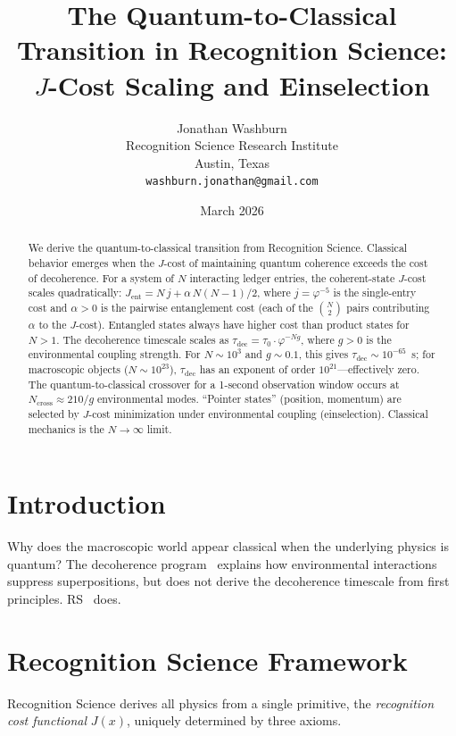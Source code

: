 \documentclass[12pt,a4paper]{article}
\title{The Quantum-to-Classical Transition in Recognition Science:\\
$J$-Cost Scaling and Einselection}
\author{Jonathan Washburn\\
Recognition Science Research Institute\\
Austin, Texas\\
\texttt{washburn.jonathan@gmail.com}}
\date{March 2026}
\theoremstyle{definition}
\theoremstyle{remark}
\begin{document}
\maketitle

\begin{abstract}
We derive the quantum-to-classical transition from Recognition
Science.  Classical behavior emerges when the $J$-cost of maintaining
quantum coherence exceeds the cost of decoherence.  For a system of
$N$ interacting ledger entries, the coherent-state $J$-cost scales
quadratically: $J_{\mathrm{ent}} = N\,j + \alpha\,N(N-1)/2$, where
$j = \varphi^{-5}$ is the single-entry cost and $\alpha > 0$ is the
pairwise entanglement cost (each of the $\binom{N}{2}$ pairs
contributing $\alpha$ to the $J$-cost).  Entangled states always
have higher cost than product states for $N > 1$.  The decoherence
timescale scales as $\tau_{\mathrm{dec}} = \tau_0 \cdot \varphi^{-Ng}$,
where $g > 0$ is the environmental coupling strength.  For
$N \sim 10^3$ and $g \sim 0.1$, this gives
$\tau_{\mathrm{dec}} \sim 10^{-65}$~s; for macroscopic objects
($N \sim 10^{23}$), $\tau_{\mathrm{dec}}$ has an exponent of
order $10^{21}$---effectively zero.  The quantum-to-classical
crossover for a 1-second observation window occurs at
$N_{\mathrm{cross}} \approx 210/g$ environmental modes.
``Pointer states'' (position, momentum) are selected by $J$-cost
minimization under environmental coupling (einselection).
Classical mechanics is the $N \to \infty$ limit.
\end{abstract}

\section{Introduction}

Why does the macroscopic world appear classical when the underlying
physics is quantum?  The decoherence program~\cite{Zurek} explains
how environmental interactions suppress superpositions, but does not
derive the decoherence timescale from first principles.
RS~\cite{RS_Axioms} does.

\section{Recognition Science Framework}
\label{sec:framework}

Recognition Science derives all physics from a single primitive,
the \emph{recognition cost functional} $J(x)$, uniquely determined
by three axioms.
\end{document}
